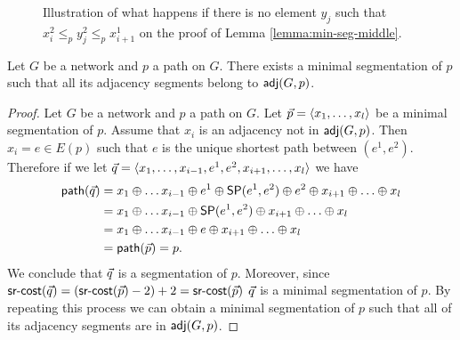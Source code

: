 \begin{figure}
\begin{center}
\end{center}
\caption{Illustration of what happens if there is no element $y_j$ such that $x^2_i \leq_p y^2_j \leq_p x^1_{i + 1}$ on the proof of Lemma \ref{lemma:min-seg-middle}.}
\label{fig:min-seg-middle}
\end{figure}

\begin{lemma}
\label{lemma:ajd-min}
Let $G$ be a network and $p$ a path on $G$. There exists a minimal segmentation of $p$ such that all its adjacency segments
belong to $\textsf{adj}(G, p)$.
\end{lemma}

\begin{proof}
Let $G$ be a network and $p$ a path on $G$. Let $\vec{p} = \langle x_1, \ldots, x_l \rangle$ be a minimal segmentation of $p$. Assume that 
$x_i$ is an adjacency not in $\textsf{adj}(G, p)$. Then $x_i = e \in E(p)$ such that
$e$ is the unique shortest path between $(e^1, e^2)$. Therefore if we let $\vec{q} = \langle x_1, \ldots, x_{i - 1}, e^1, e^2, x_{i + 1}, \ldots, x_l \rangle$
we have
\begin{align*}
\mathsf{path}(\vec{q}) & = x_1 \oplus \ldots x_{i - 1} \oplus e^1 \oplus \mathsf{SP}(e^1, e^2) \oplus e^2 \oplus x_{i + 1} \oplus \ldots \oplus x_l \\
             & = x_1 \oplus \ldots x_{i - 1} \oplus \mathsf{SP}(e^1, e^2) \oplus x_{i + 1} \oplus \ldots \oplus x_l \\
             & = x_1 \oplus \ldots x_{i - 1} \oplus e \oplus x_{i + 1} \oplus \ldots \oplus x_l \\
             & = \mathsf{path}(\vec{p}) = p. \\
\end{align*}
We conclude that $\vec{q}$ is a segmentation of $p$. Moreover, since $\textsf{sr-cost}(\vec{q}) = (\textsf{sr-cost}(\vec{p}) - 2) + 2 = \textsf{sr-cost}(\vec{p})$ 
$\vec{q}$ is a minimal segmentation of $p$. By repeating this process we can obtain a minimal segmentation of $p$
such that all of its adjacency segments are in $\textsf{adj}(G, p)$.
\end{proof}

